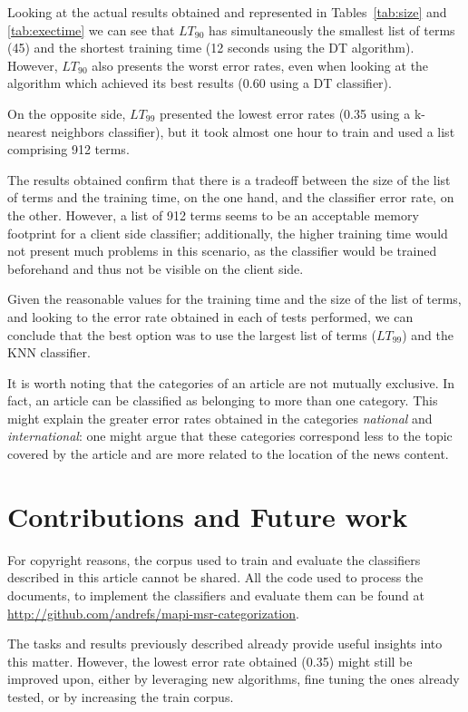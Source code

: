 \documentclass[runningheads,a4paper]{llncs}[2015/06/24]
\begin{document}
Looking at the actual results obtained and represented in
Tables~\ref{tab:size} and \ref{tab:exectime} we can see that $LT_{90}$
has simultaneously the smallest list of terms (45) and the shortest
training time (12 seconds using the DT algorithm). However, $LT_{90}$
also presents the worst error rates, even when looking at the
algorithm which achieved its best results (0.60 using a DT
classifier).

On the opposite side, $LT_{99}$ presented the lowest error rates (0.35
using a k-nearest neighbors classifier), but it took almost one hour
to train and used a list comprising 912 terms.

The results obtained confirm that there is a tradeoff between the size
of the list of terms and the training time, on the one hand, and the
classifier error rate, on the other. However, a list of 912 terms
seems to be an acceptable memory footprint for a client side
classifier; additionally, the higher training time would not present
much problems in this scenario, as the classifier would be trained
beforehand and thus not be visible on the client side.

Given the reasonable values for the training time and the size of the
list of terms, and looking to the error rate obtained in each of tests
performed, we can conclude that the best option was to use the largest
list of terms ($LT_{99}$) and the KNN classifier.

It is worth noting that the categories of an article are not mutually
exclusive. In fact, an article can be classified as belonging to more
than one category. This might explain the greater error rates obtained
in the categories \textit{national} and  \textit{international}: one
might argue that these categories correspond less to the topic covered
by the article and are more related to the location of the news
content.

\section{Contributions and Future work}
For copyright reasons, the corpus used to train and evaluate the
classifiers described in this article cannot be shared. All the code
used to process the documents, to implement the classifiers and
evaluate them can be found at\\
\url{http://github.com/andrefs/mapi-msr-categorization}.

The tasks and results previously described already provide useful
insights into this matter. However, the lowest error rate obtained
(0.35) might still be improved upon, either by leveraging new
algorithms, fine tuning the ones already tested, or by increasing the
train corpus.
\end{document}
